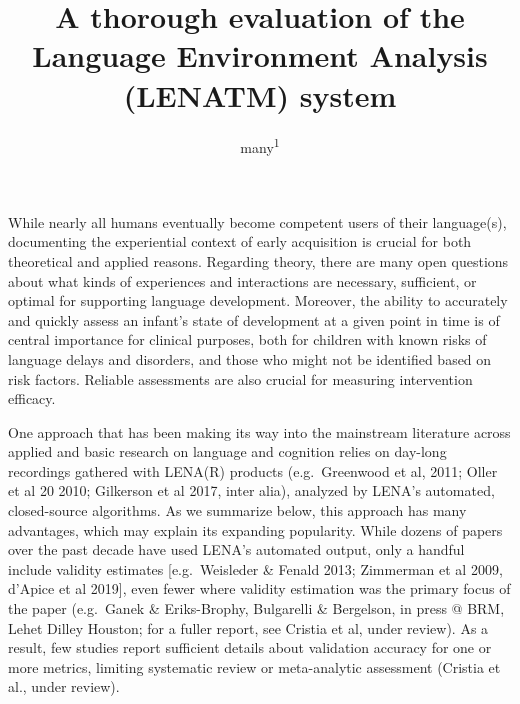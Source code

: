 \documentclass[english,floatsintext,man]{apa6}
\title{A thorough evaluation of the Language Environment Analysis (LENATM)
system}
\author{many\textsuperscript{1}}
\affiliation{
    \vspace{0.5cm}
          \textsuperscript{1}   }
\begin{document}
\maketitle

\setcounter{secnumdepth}{0}



While nearly all humans eventually become competent users of their
language(s), documenting the experiential context of early acquisition
is crucial for both theoretical and applied reasons. Regarding theory,
there are many open questions about what kinds of experiences and
interactions are necessary, sufficient, or optimal for supporting
language development. Moreover, the ability to accurately and quickly
assess an infant's state of development at a given point in time is of
central importance for clinical purposes, both for children with known
risks of language delays and disorders, and those who might not be
identified based on risk factors. Reliable assessments are also crucial
for measuring intervention efficacy.

One approach that has been making its way into the mainstream literature
across applied and basic research on language and cognition relies on
day-long recordings gathered with LENA(R) products (e.g.~Greenwood et
al, 2011; Oller et al 20 2010; Gilkerson et al 2017, inter alia),
analyzed by LENA's automated, closed-source algorithms. As we summarize
below, this approach has many advantages, which may explain its
expanding popularity. While dozens of papers over the past decade have
used LENA's automated output, only a handful include validity estimates
{[}e.g.~Weisleder \& Fenald 2013; Zimmerman et al 2009, d'Apice et al
2019{]}, even fewer where validity estimation was the primary focus of
the paper (e.g.~Ganek \& Eriks-Brophy, Bulgarelli \& Bergelson, in press
@ BRM, Lehet Dilley Houston; for a fuller report, see Cristia et al,
under review). As a result, few studies report sufficient details about
validation accuracy for one or more metrics, limiting systematic review
or meta-analytic assessment (Cristia et al., under review).
\end{document}
